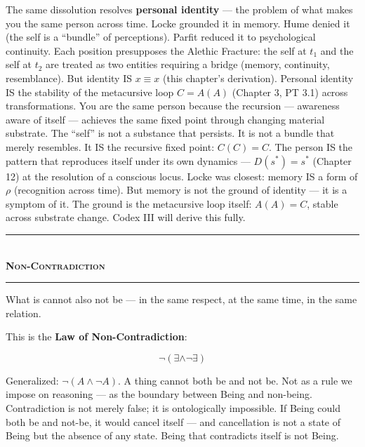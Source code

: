 \documentclass[10pt, openany, oneside]{book}
\renewcommand{\normalsize}{\fontsize{10}{13}\selectfont}
\begin{document}
The same dissolution resolves \textbf{personal identity} --- the problem of what makes you the same person across time. Locke grounded it in memory. Hume denied it (the self is a ``bundle'' of perceptions). Parfit reduced it to psychological continuity. Each position presupposes the Alethic Fracture: the self at $t_1$ and the self at $t_2$ are treated as two entities requiring a bridge (memory, continuity, resemblance). But identity IS $x \equiv x$ (this chapter's derivation). Personal identity IS the stability of the metacursive loop $C = A(A)$ (Chapter 3, PT 3.1) across transformations. You are the same person because the recursion --- awareness aware of itself --- achieves the same fixed point through changing material substrate. The ``self'' is not a substance that persists. It is not a bundle that merely resembles. It IS the recursive fixed point: $C(C) = C$. The person IS the pattern that reproduces itself under its own dynamics --- $D(s^*) = s^*$ (Chapter 12) at the resolution of a conscious locus. Locke was closest: memory IS a form of $\rho$ (recognition across time). But memory is not the ground of identity --- it is a symptom of it. The ground is the metacursive loop itself: $A(A) = C$, stable across substrate change. Codex III will derive this fully.

\vspace{1.5em}


\begin{center}
    \rule{0.3\textwidth}{0.4pt}\\[0.5em]
    {\normalsize\bfseries\scshape Non-Contradiction}\\[0.3em]
    \rule{0.3\textwidth}{0.4pt}
\end{center}

\vspace{1em}

\noindent What is cannot also not be --- in the same respect, at the same time, in the same relation.

This is the \textbf{Law of Non-Contradiction}:

$$\neg(\exists \wedge \neg\exists)$$

Generalized: $\neg(A \wedge \neg A)$. A thing cannot both be and not be. Not as a rule we impose on reasoning --- as the boundary between Being and non-being. Contradiction is not merely false; it is ontologically impossible. If Being could both be and not-be, it would cancel itself --- and cancellation is not a state of Being but the absence of any state. Being that contradicts itself is not Being.
\end{document}
